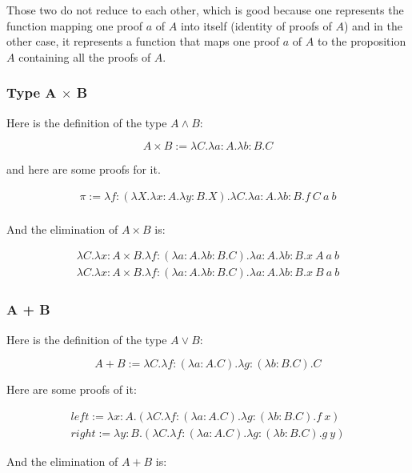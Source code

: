 Those two do not reduce to each other, which is good because one represents the function mapping one proof $a$ of $A$ into itself (identity of proofs of $A$) and in the other case, it represents a function that maps one proof $a$ of $A$ to the proposition $A$ containing all the proofs of $A$.

\subsubsection{Type A $\times$ B}

Here is the definition of the type $A \land B$:

\[
    A \times B := \lambda C.\lambda a:A.\lambda b:B.C
\]

\noindent and here are some proofs for it.

\[
\begin{array}{ll}
    \pi := \lambda f:(\lambda X.\lambda x:A.\lambda y:B.X).\lambda C.\lambda a:A.\lambda b:B.f\ C\ a\ b\\
\end{array}
\]

\noindent And the elimination of $A \times B$ is:

\[
\begin{array}{ll}
    \lambda C.\lambda x:A \times B.\lambda f:(\lambda a:A.\lambda b:B.C).\lambda a:A.\lambda b:B.x\ A\ a\ b \\
    \lambda C.\lambda x:A \times B.\lambda f:(\lambda a:A.\lambda b:B.C).\lambda a:A.\lambda b:B.x\ B\ a\ b
\end{array}
\]



\subsubsection{A + B}

Here is the definition of the type $A \lor B$:

\[
    A + B := \lambda C.\lambda f:(\lambda a:A.C).\lambda g:(\lambda b:B.C).C
\]

\noindent Here are some proofs of it:

\[
\begin{array}{ll}
    left := \lambda x:A.(\lambda C.\lambda f:(\lambda a:A.C).\lambda g:(\lambda b: B.C).f\ x) \\
    right := \lambda y:B.(\lambda C.\lambda f:(\lambda a:A.C).\lambda g:(\lambda b: B.C).g\ y)
\end{array}
\]

\noindent And the elimination of $A + B$ is:

